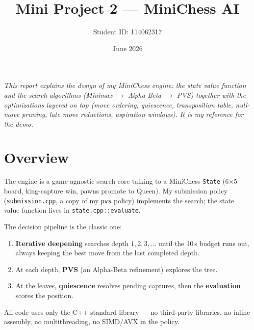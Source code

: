 \documentclass[11pt]{article}
\title{\textbf{Mini Project 2 — MiniChess AI}}
\author{Student ID: 114062317}
\date{June 2026}
\begin{document}
\maketitle

\noindent\textit{This report explains the design of my MiniChess engine: the
state value function and the search algorithms (Minimax $\to$ Alpha-Beta $\to$
PVS) together with the optimizations layered on top (move ordering, quiescence,
transposition table, null-move pruning, late move reductions, aspiration
windows). It is my reference for the demo.}

\section{Overview}
The engine is a game-agnostic search core talking to a MiniChess \texttt{State}
(6$\times$5 board, king-capture win, pawns promote to Queen). My submission
policy (\texttt{submission.cpp}, a copy of my \texttt{pvs} policy) implements the
search; the state value function lives in \texttt{state.cpp::evaluate}.

The decision pipeline is the classic one:
\begin{enumerate}[noitemsep]
  \item \textbf{Iterative deepening} searches depth $1,2,3,\dots$ until the 10\,s
        budget runs out, always keeping the best move from the last completed depth.
  \item At each depth, \textbf{PVS} (an Alpha-Beta refinement) explores the tree.
  \item At the leaves, \textbf{quiescence} resolves pending captures, then the
        \textbf{evaluation} scores the position.
\end{enumerate}
All code uses only the C++ standard library --- no third-party libraries, no
inline assembly, no multithreading, no SIMD/AVX in the policy.
\end{document}
